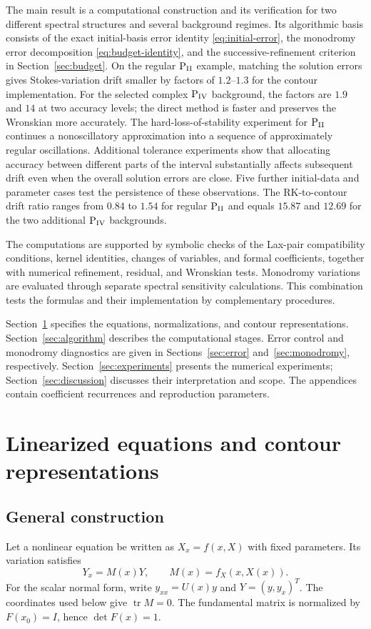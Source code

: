 The main result is a computational construction and its verification for
two different spectral structures and several background regimes.
Its algorithmic basis consists of the exact initial-basis error identity
\eqref{eq:initial-error}, the monodromy error decomposition
\eqref{eq:budget-identity}, and the successive-refinement criterion in
Section~\ref{sec:budget}. On the regular $\mathrm{P}_{\mathrm{II}}$ example, matching the
solution errors gives Stokes-variation drift smaller by factors of
$1.2$--$1.3$ for the contour implementation. For the selected complex
$\mathrm{P}_{\mathrm{IV}}$ background, the factors are $1.9$ and $14$ at two accuracy levels;
the direct method is faster and preserves the Wronskian more accurately.
The hard-loss-of-stability experiment for $\mathrm{P}_{\mathrm{II}}$ continues a
nonoscillatory approximation into a sequence of approximately regular
oscillations. Additional tolerance experiments show that allocating
accuracy between different parts of the interval substantially affects
subsequent drift even when the overall solution errors are close.
Five further initial-data and parameter cases test the persistence of
these observations. The RK-to-contour drift ratio ranges from $0.84$ to
$1.54$ for regular $\mathrm{P}_{\mathrm{II}}$ and equals $15.87$ and $12.69$ for the two
additional $\mathrm{P}_{\mathrm{IV}}$ backgrounds.

The computations are supported by symbolic checks of the Lax-pair
compatibility conditions, kernel identities, changes of variables, and
formal coefficients, together with numerical refinement, residual, and
Wronskian tests. Monodromy variations are evaluated through separate
spectral sensitivity calculations. This combination tests the formulas
and their implementation by complementary procedures.

Section~\ref{sec:formulas} specifies the equations, normalizations, and
contour representations. Section~\ref{sec:algorithm} describes the
computational stages. Error control and monodromy diagnostics are given
in Sections~\ref{sec:error} and~\ref{sec:monodromy}, respectively.
Section~\ref{sec:experiments} presents the numerical experiments;
Section~\ref{sec:discussion} discusses their interpretation and scope.
The appendices contain coefficient recurrences and reproduction parameters.

\section{Linearized equations and contour representations}\label{sec:formulas}
\subsection{General construction}
Let a nonlinear equation be written as $X_x=f(x,X)$ with fixed parameters.
Its variation satisfies
\begin{equation}\label{eq:tangent}
 Y_x=M(x)Y,\qquad M(x)=f_X(x,X(x)).
\end{equation}
For the scalar normal form, write $y_{xx}=U(x)y$ and $Y=(y,y_x)^T$.
The coordinates used below give $\operatorname{tr}M=0$.
The fundamental matrix is normalized by $F(x_0)=I$, hence $\det F(x)=1$.

